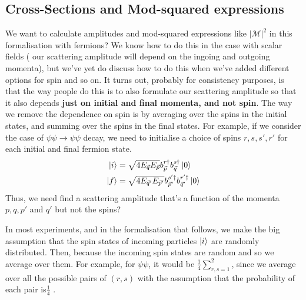 \subsection{Cross-Sections and Mod-squared expressions}
We want to calculate amplitudes and mod-squared 
expressions like $ | \mathcal{ M } | ^ 2 $ in this 
formalisation with fermions? We know 
how to do this in the case with scalar fields (
our scattering amplitude will depend on the ingoing and 
outgoing momenta), 
but we've yet do discuss how to do this when we've 
added different options for spin and so on. 
It turns out, probably for consistency purposes, is  
that the way people do this is to also 
formulate our scattering amplitude so that it also 
depends \textbf{just on initial and final momenta, and 
not spin}. The way we remove the dependence on spin 
is by averaging over the spins in the initial states, 
and summing over the spins in the final states. 
For example, if we consider the case of $ \psi \psi \to \psi \psi $ 
decay, we need to initialise a choice of spins $ r, s, s' , r' $ for each initial and final fermion
state. 
\begin{align*}
\ket{ i }  &= \sqrt{ 4 E_{ \vec{q} } E _{ \vec{p} }  }  
b_{ \vec{p} } ^{ r \dagger } b _{ \vec{q} } ^{ s \dagger } \ket{ 0 } \\
\ket{ f } &=  \sqrt{ 4 E_{ \vec{q} ' } E _{\vec{p} ' } }  
b_{ \vec{p} ' } ^{ s ' \dagger } b _{\vec{q} ' } ^{ r ' \dagger } \ket{ 0 } 
\end{align*}
Thus, we need find a scattering amplitude that's a function 
of the momenta $ p , q , p ' $ and $ q ' $ but not the spins? 

In most experiments, and in the formalisation that follows, we make the big assumption that 
the spin states of incoming particles $ \ket{ i } $ are randomly 
distributed. Then, because the incoming spin states are random 
and so we average over them. For example, for 
$ \psi \psi $, it would be $ \frac{1}{4 } \sum_{ r , s = 1 } ^ 2 $, 
since we average over all the possible pairs of 
$ \left( r, s   \right)  $ with the assumption 
that the probability of each pair is$ \frac{1}{4 }$ . 


